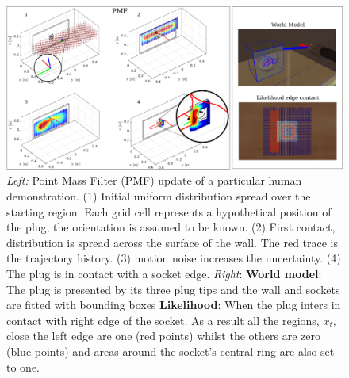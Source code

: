 
\begin{figure}
 \centering
   \includegraphics[width=\textwidth]{./ch4-PiH/Figures/PMF/pmf_likelihood.pdf}
   \caption{\textit{Left:} Point Mass Filter (PMF) update of a particular human demonstration. (1) Initial uniform distribution spread over the starting 
   region. Each grid cell represents a hypothetical position of the plug, the orientation is assumed to be known. (2) First contact, distribution is spread across the surface of the wall. The red trace 
   is the trajectory history. (3) motion noise increases the uncertainty. (4) The plug is in contact with a socket edge.
   \textit{Right}: \textbf{World model}: The plug is presented by its three plug tips and the wall and sockets are fitted with bounding boxes 
   \textbf{Likelihood}: When the plug inters in contact with right edge of the socket. As a result all the regions, $x_t$, close the left edge are one (red points)
    whilst the others are zero (blue points) and areas around the socket's central ring are also set to one. }
  \label{fig:PMF}
\end{figure}

